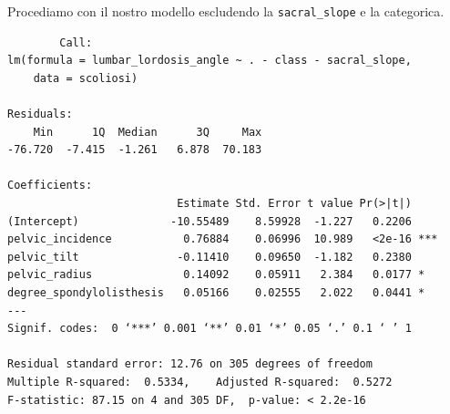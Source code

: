 \documentclass{beamer}
\begin{document}
\begin{frame}[fragile]
	Procediamo con il nostro modello escludendo la \texttt{sacral\_slope} e la categorica.

	{\tiny
	\begin{verbatim}
		Call:
lm(formula = lumbar_lordosis_angle ~ . - class - sacral_slope, 
    data = scoliosi)

Residuals:
    Min      1Q  Median      3Q     Max 
-76.720  -7.415  -1.261   6.878  70.183 

Coefficients:
                          Estimate Std. Error t value Pr(>|t|)    
(Intercept)              -10.55489    8.59928  -1.227   0.2206    
pelvic_incidence           0.76884    0.06996  10.989   <2e-16 ***
pelvic_tilt               -0.11410    0.09650  -1.182   0.2380    
pelvic_radius              0.14092    0.05911   2.384   0.0177 *  
degree_spondylolisthesis   0.05166    0.02555   2.022   0.0441 *  
---
Signif. codes:  0 ‘***’ 0.001 ‘**’ 0.01 ‘*’ 0.05 ‘.’ 0.1 ‘ ’ 1

Residual standard error: 12.76 on 305 degrees of freedom
Multiple R-squared:  0.5334,	Adjusted R-squared:  0.5272 
F-statistic: 87.15 on 4 and 305 DF,  p-value: < 2.2e-16
	\end{verbatim}
	}
\end{frame}
\end{document}
